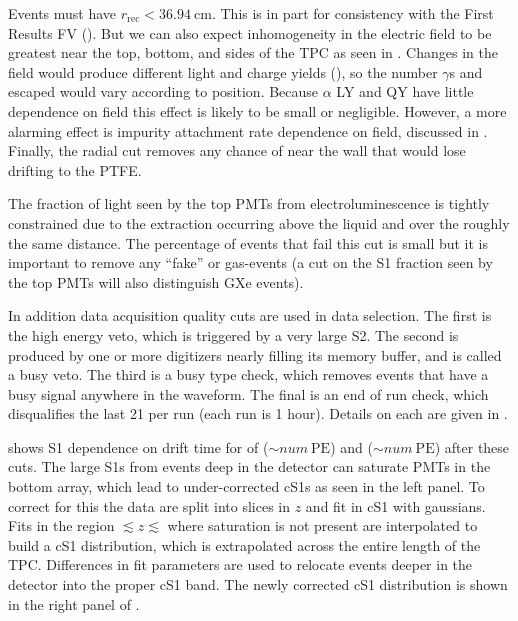 Events must have $r_{\mathrm{rec}} < 36.94\ \mathrm{cm}$.  This is in part for consistency with the First Results FV
().  But we can also expect inhomogeneity in the electric field to be greatest near the top, bottom, and sides of the
TPC as seen in .  Changes in the field would produce different light and charge yields
(), so the number $\gamma$s and escaped \electron would vary according to position.  Because $\alpha$
LY and QY have little dependence on field this effect is likely to be small or negligible.  However, a more alarming effect is impurity
attachment rate dependence on field, discussed in .  Finally, the radial cut removes any
chance of \alphadecays near the wall that would lose drifting \electron to the PTFE.

The fraction of light seen by the top PMTs from electroluminescence is tightly constrained due to the extraction occurring above the
liquid and over the roughly the same distance.  The percentage of events that fail this cut is small but it is important to remove any
``fake'' or gas-events (a cut on the S1 fraction seen by the top PMTs will also distinguish GXe events).

In addition data acquisition quality cuts are used in data selection.  The first is the high energy veto, which is triggered by a very
large S2.  The second is produced by one or more digitizers nearly filling its memory buffer, and is called a busy veto.  The third is
a busy type check, which removes events that have a busy signal anywhere in the waveform.  The final is an end of run check, which
disqualifies the last 21 per run (each run is 1 hour).  Details on each are given in .

 shows S1 dependence on drift time for \alphadecays of 
(${\sim} num\ \mathrm{PE}$) and  (${\sim} num\ \mathrm{PE}$) after these cuts.  The large
S1s from events deep in the detector can saturate PMTs in the bottom array, which lead to under-corrected cS1s as seen in the left
panel.  To correct for this the data are split into slices in $z$ and fit in cS1 with gaussians.  Fits in the region
$\lesssim z \lesssim$ where saturation is not present are interpolated to build a cS1 distribution, which is extrapolated across the
entire length of
the TPC.  Differences in fit parameters are used to relocate events deeper in the detector into the proper cS1 band.  The newly corrected
cS1 distribution is shown in the right panel of .

